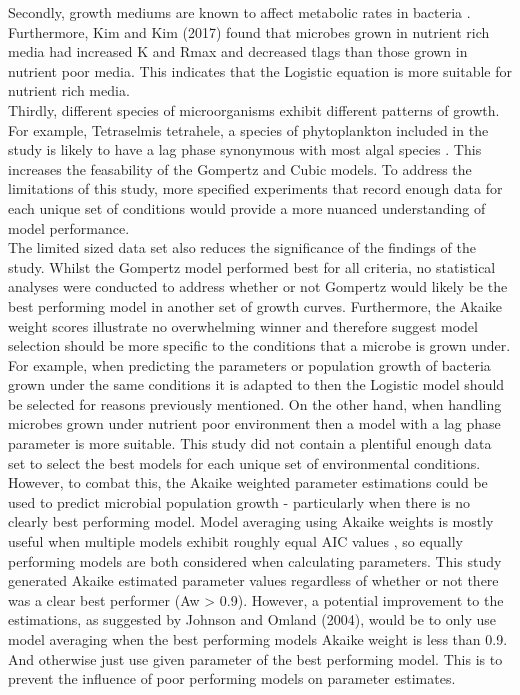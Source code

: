\documentclass[11pt]{article}
\begin{document}
Secondly, growth mediums are known to affect metabolic rates in bacteria \cite{KIM201764}. Furthermore, Kim and Kim (2017) found that microbes grown in nutrient rich media had increased K and Rmax and decreased tlags than those grown in nutrient poor media. This indicates that the Logistic equation is more suitable for nutrient rich media.\\

Thirdly, different species of microorganisms exhibit different patterns of growth. For example, Tetraselmis tetrahele, a species of phytoplankton included in the study is likely to have a lag phase synonymous with most algal species \cite{ebaac5c3-39dd-33ef-a890-3745d155862c}. This increases the feasability of the Gompertz and Cubic models. To address the limitations of this study, more specified experiments that record enough data for each unique set of conditions would provide a more nuanced understanding of model performance.\\

The limited sized data set also reduces the significance of the findings of the study. Whilst the Gompertz model performed best for all criteria, no statistical analyses were conducted to address whether or not Gompertz would likely be the best performing model in another set of growth curves. Furthermore, the Akaike weight scores illustrate no overwhelming winner and therefore suggest model selection should be more specific to the conditions that a microbe is grown under. For example, when predicting the parameters or population growth of bacteria grown under the same conditions it is adapted to then the Logistic model should be selected for reasons previously mentioned. On the other hand, when handling microbes grown under nutrient poor environment then a model with a lag phase parameter is more suitable. This study did not contain a plentiful enough data set to select the best models for each unique set of environmental conditions. However, to combat this, the Akaike weighted parameter estimations could be used to predict microbial population growth - particularly when there is no clearly best performing model. Model averaging using Akaike weights is mostly useful when multiple models exhibit roughly equal AIC values \cite{JOHNSON2004101}, so equally performing models are both considered when calculating parameters. This study generated Akaike estimated parameter values regardless of whether or not there was a clear best performer (Aw > 0.9). However, a potential improvement to the estimations, as suggested by Johnson and Omland (2004), would be to only use model averaging when the best performing models Akaike weight is less than 0.9. And otherwise just use given parameter of the best performing model. This is to prevent the influence of poor performing models on parameter estimates.
\end{document}
